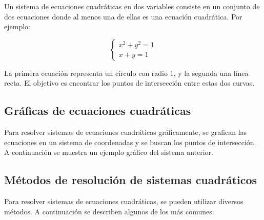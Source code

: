     Un sistema de ecuaciones cuadráticas en dos variables consiste en un conjunto de dos ecuaciones donde al menos una de ellas es una ecuación cuadrática. Por ejemplo:
    
    \[
    \begin{cases}
        x^2 + y^2 = 1 \\
        x + y = 1
    \end{cases}
    \]
    
    La primera ecuación representa un círculo con radio 1, y la segunda una línea recta. El objetivo es encontrar los puntos de intersección entre estas dos curvas.
    
    \subsection{Gráficas de ecuaciones cuadráticas}
    
    Para resolver sistemas de ecuaciones cuadráticas gráficamente, se grafican las ecuaciones en un sistema de coordenadas y se buscan los puntos de intersección. A continuación se muestra un ejemplo gráfico del sistema anterior.
    
        
        
        
    
    \subsection{Métodos de resolución de sistemas cuadráticos}
    
    Para resolver sistemas de ecuaciones cuadráticas, se pueden utilizar diversos métodos. A continuación se describen algunos de los más comunes:
    
